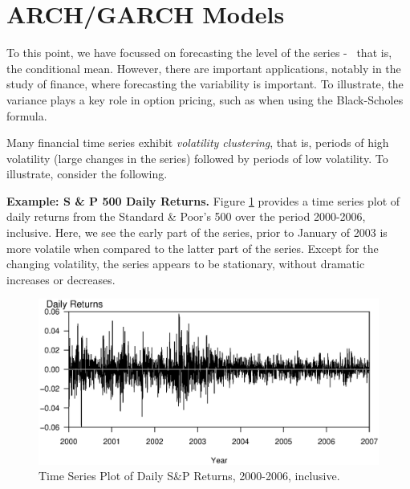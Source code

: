\section{ARCH/GARCH Models}

To this point, we have focussed on forecasting the level of the
series - \ that is, the conditional mean. However, there are
important applications, notably in the study of finance, where
forecasting the variability is important. To illustrate, the
variance plays a key role in option pricing, such as when using the
Black-Scholes formula.

Many financial time series exhibit \emph{volatility clustering},
that is, periods of high volatility (large changes in the series)
followed by periods of low volatility. To illustrate, consider the
following.

\linejed


\textbf{Example: S \& P 500 Daily Returns.} Figure \ref{F9:SandPDailyTS}  provides a time series
plot of daily returns from the Standard \& Poor's 500 over the
period 2000-2006, inclusive. Here, we see the early part of the
series, prior to January of 2003 is more volatile when compared to
the latter part of the series. Except for the changing volatility,
the series appears to be stationary, without dramatic increases or
decreases.

\begin{figure}[htp]
  \begin{center}
    \includegraphics[width=.8\textwidth]
     {Chapter9Forecasting/SandPDailyTS.eps}
    \caption{\label{F9:SandPDailyTS} \small Time Series Plot of Daily S\&P Returns, 2000-2006, inclusive.}
  \end{center}
\end{figure}

\linejed


